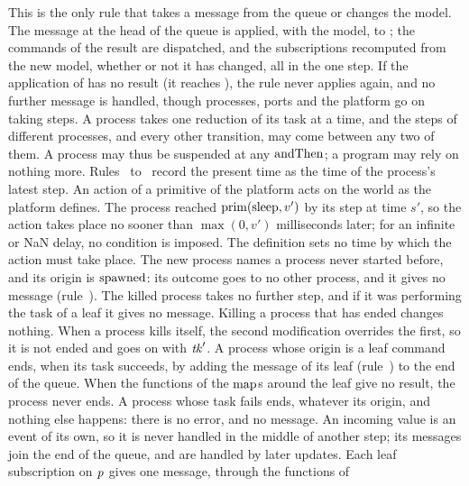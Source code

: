 \begin{rulecomments}
 This is the only rule that takes a message from the
queue or changes the model. The message at the head of the queue is applied,
with the model, to ; the commands of the result are dispatched,
and the subscriptions recomputed from the new model, whether or not it has
changed, all in the one step. If the application of  has no
result (it reaches ), the rule never applies again, and no
further message is handled, though processes, ports and the platform go on
taking steps. %
 A process takes one reduction of its task at a time,
and the steps of different processes, and every other transition, may come
between any two of them. A process may thus be suspended at any
$\mathrm{andThen}$; a program may rely on nothing more. %
Rules~ to~ record the present
time as the time of the process's latest step. An action of a primitive of
the platform acts on the world as the platform defines.
 The process reached $\mathrm{prim}(\mathrm{sleep},v')$ by its
step at time $s'$, so the action takes place no sooner than $\max(0,v')$
milliseconds later; for an infinite or NaN delay, no condition is imposed.
The definition sets no time by which the action must take place. %
 The new process names a process never started
before, and its origin is $\mathrm{spawned}$: its outcome goes to no other process,
and it gives no message (rule~). %
 The killed process takes no further step, and if it
was performing the task of a leaf it gives no message. Killing a process
that has ended changes nothing. When a process kills itself, the second
modification overrides the first, so it is not ended and goes on with
$\mathit{tk}'$. %
 A process whose origin is a leaf command ends,
when its task succeeds, by adding the message of its leaf
(rule~) to the end of the queue. When the functions of
the $\mathrm{map}$s around the leaf give no result, the process never ends.
 A process whose task fails ends, whatever its origin,
and nothing else happens: there is no error, and no message. %
 An incoming value is an event of its own, so it is
never handled in the middle of another step; its messages join the end of the
queue, and are handled by later updates. %
Each leaf subscription on $\mathit{p}$ gives one message, through the functions of

\end{rulecomments}
